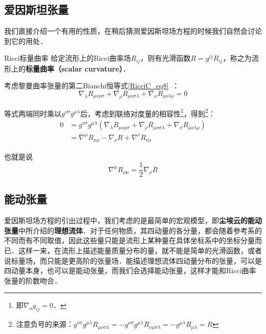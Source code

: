 

\subsection{爱因斯坦张量}

我们直接介绍一个有用的性质，在稍后猜测爱因斯坦场方程的时候我们自然会讨论到它的用处．

\begin{definition}{Ricci标量曲率}
给定流形上的Ricci曲率场$R_{ij}$，则有光滑函数$R=g^{ij}R_{ij}$，称之为流形上的\textbf{标量曲率（scalar curvature）}．
\end{definition}

考虑黎曼曲率张量的第二Bianchi恒等式\autoref{RicciC_eq8}~：
\begin{equation}
\nabla_\lambda R_{\mu\nu\rho\sigma}+\nabla_\rho R_{\mu\nu\sigma\lambda}+\nabla_\sigma R_{\mu\nu\lambda\rho}=0
\end{equation}

等式两端同时乘以$g^{\nu\sigma}g^{\mu\lambda}$后，考虑到联络对度量的相容性\footnote{即$\nabla_ag_{ij}=0$．}，得到\footnote{注意负号的来源：$g^{\nu\sigma}g^{\mu\lambda}R_{\mu\nu\sigma\lambda}=-g^{\nu\sigma}g^{\mu\lambda}R_{\nu\mu\sigma\lambda}=-g^{\mu\lambda}R_{\mu\lambda}=R$}：
\begin{equation}
\begin{aligned}
0&=g^{\nu\sigma}g^{\mu\lambda}(\nabla_\lambda R_{\mu\nu\rho\sigma}+\nabla_\rho R_{\mu\nu\sigma\lambda}+\nabla_\sigma R_{\mu\nu\lambda\rho})\\
&=\nabla^\mu R_{\mu\rho}-\nabla_\rho R+\nabla^{\nu}R_{\nu\rho}
\end{aligned}
\end{equation}

也就是说
\begin{equation}
\nabla^\mu R_{\rho\mu}=\frac{1}{2}\nabla_\rho R
\end{equation}




\subsection{能动张量}

爱因斯坦场方程的引出过程中，我们考虑的是最简单的宏观模型，即\textbf{尘埃云的能动张量}中所介绍的\textbf{理想流体}．对于任何物质，其四动量的各分量，都会随着参考系的不同而有不同取值，因此这些量只能是流形上某种量在具体坐标系中的坐标分量而已．这样一来，在流形上描述能量质量分布的量，就不能是简单的光滑函数，或者说标量场，而只能是更高阶的张量场．能描述理想流体四动量分布的张量，可以是四动量本身，也可以是能动张量，而我们会选择能动张量，这样才能和Ricci曲率张量的阶数吻合．

















